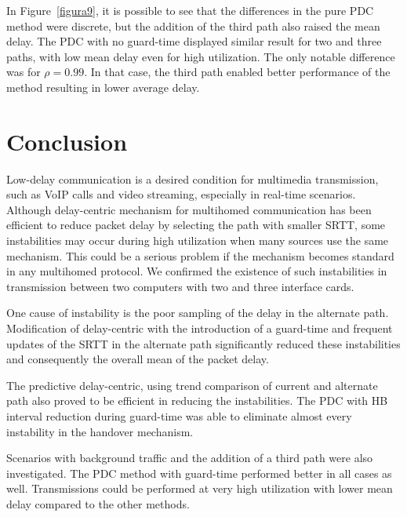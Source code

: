 \documentclass{sbrt2015}
\begin{document}
In Figure~\ref{figura9}, it is possible to see that the differences in the pure PDC method were discrete, but the addition of the third path also raised the mean delay. The PDC with no guard-time displayed similar result for two and three paths, with low mean delay even for high utilization. 
The only notable difference was for $\rho=0.99$. In that case, the third path enabled better performance of the method resulting in lower average delay.


\section{Conclusion}

Low-delay communication is a desired condition for multimedia transmission, such as VoIP calls and video streaming, especially in real-time scenarios. Although delay-centric mechanism for multihomed communication has been efficient to reduce packet delay by selecting the path with smaller SRTT, some instabilities may occur during high utilization when many sources use the same mechanism. This could be a serious problem if the mechanism becomes standard in any multihomed protocol. We confirmed the existence of such instabilities in transmission between two computers with two and three interface cards.

One cause of instability is the poor sampling of the delay in the alternate path. Modification of delay-centric with the introduction of a guard-time and frequent updates of the SRTT in the alternate path significantly reduced these instabilities and consequently the overall mean of the packet delay.

The predictive delay-centric, using trend comparison of current and alternate path also proved to be efficient in reducing the instabilities. The PDC with HB interval reduction during guard-time was able to eliminate almost every instability in the handover mechanism. 

Scenarios with background traffic and the addition of a third path were also investigated. The PDC method with guard-time performed better in all cases as well. Transmissions could be performed at very high utilization with lower mean delay compared to the other methods.





\end{document}

